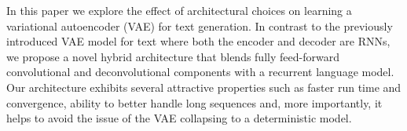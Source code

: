 In this paper we explore the effect of architectural choices on learning a variational autoencoder (VAE) for text generation. In contrast to the previously introduced VAE model for text where both the encoder and decoder are RNNs, we propose a novel hybrid architecture that blends fully feed-forward convolutional and deconvolutional components with a recurrent language model. Our architecture exhibits several attractive properties such as faster run time and convergence, ability to better handle long sequences and, more importantly, it helps to avoid the issue of the VAE collapsing to a deterministic model.

